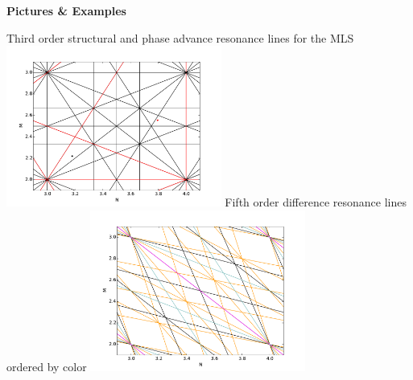 \documentclass[
logosetup=topbar 
portrait,
a0paper%
]
{baposter}
\begin{document}
\begin{poster}
{\begin{itemize}
\end{itemize}
{\color{hzbblue}\bf\large Pictures \& Examples}
\begin{center}
\large Third order structural and phase advance resonance lines for the MLS
\includegraphics[width=200pt]{Pics/image.pdf}
\large Fifth order difference resonance lines ordered by color
\includegraphics[width=200pt]{Pics/image2.pdf}
\end{center}

}
\end{poster}
\end{document}
